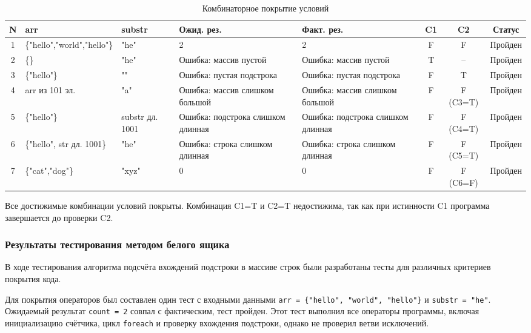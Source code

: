 \documentclass{article}[14pt]
\begin{document}
\begin{table}[H]
\centering
\caption{Комбинаторное покрытие условий}
\begin{tabularx}{\textwidth}{|c|X|X|X|X|c|c|c|}
\hline
\textbf{N} & \textbf{arr} & \textbf{substr} & \textbf{Ожид. рез.} & \textbf{Факт. рез.} & \textbf{C1} & \textbf{C2} & \textbf{Статус} \\
\hline
1 & \{"hello","world","hello"\} & "he" & 2 & 2 & F & F & Пройден \\
\hline
2 & \{\} & "he" & Ошибка: массив пустой & Ошибка: массив пустой & T & -- & Пройден \\
\hline
3 & \{"hello"\} & "" & Ошибка: пустая подстрока & Ошибка: пустая подстрока & F & T & Пройден \\
\hline
4 & arr из 101 эл. & "a" & Ошибка: массив слишком большой & Ошибка: массив слишком большой & F & F (C3=T) & Пройден \\
\hline
5 & \{"hello"\} & substr дл. 1001 & Ошибка: подстрока слишком длинная & Ошибка: подстрока слишком длинная & F & F (C4=T) & Пройден \\
\hline
6 & \{"hello", str дл. 1001\} & "he" & Ошибка: строка слишком длинная & Ошибка: строка слишком длинная & F & F (C5=T) & Пройден \\
\hline
7 & \{"cat","dog"\} & "xyz" & 0 & 0 & F & F (C6=F) & Пройден \\
\hline
\end{tabularx}
\end{table}

Все достижимые комбинации условий покрыты. Комбинация C1=T и C2=T недостижима, так как при истинности C1 программа завершается до проверки C2.

\subsubsection{Результаты тестирования методом белого ящика}

В ходе тестирования алгоритма подсчёта вхождений подстроки в массиве строк были разработаны тесты для различных критериев покрытия кода.

Для покрытия операторов был составлен один тест с входными данными \texttt{arr = \{"hello", "world", "hello"\}} и \texttt{substr = "he"}. Ожидаемый результат \texttt{count = 2} совпал с фактическим, тест пройден. Этот тест выполнил все операторы программы, включая инициализацию счётчика, цикл \texttt{foreach} и проверку вхождения подстроки, однако не проверил ветви исключений.
\end{document}
